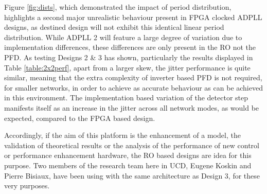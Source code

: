 Figure \ref{fig:dists}, which demonstrated the impact of period distribution, highlights a second major unrealistic behaviour present in \ac{FPGA} clocked \ac{ADPLL} designs, as  destined design will not exhibit this identical linear period distribution. While \ac{ADPLL} 2 will feature a large degree of variation due to implementation differences, these differences are only present in the \ac{RO} not the \ac{PFD}. As testing Designs 2 \& 3 has shown, particularly the results displayed in Table \ref{table:2x2perf}, apart from a larger skew, the jitter performance is quite similar, meaning that the extra complexity of inverter based \ac{PFD} is not required, for smaller networks, in order to achieve as accurate behaviour as can be achieved in this environment. The implementation based variation of the detector step manifests itself as an increase in the jitter across all network modes, as would be expected, compared to the \ac{FPGA} based design.

Accordingly, if the aim of this platform is the enhancement of a model, the validation of theoretical results or the analysis of the performance of new control or performance enhancement hardware, the \ac{RO} based designs are idea for this purpose. Two members of the research team here in \acs{UCD}, Eugene Koskin and Pierre Bisiaux, have been using  with the same architecture as Design 3, for these very purposes.

